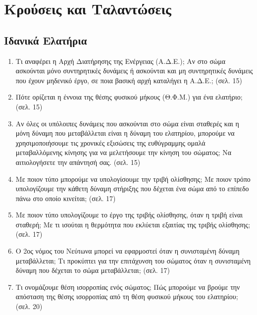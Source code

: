 \documentclass{article}
\begin{document}
\section[1]{Κρούσεις και Ταλαντώσεις}

\subsection{Ιδανικά Ελατήρια}

\begin{enumerate}

      \item
            Τι αναφέρει η Αρχή Διατήρησης της Ενέργειας (Α.Δ.Ε.); Αν στο σώμα ασκούνται μόνο συντηρητικές δυνάμεις ή ασκούνται και μη συντηρητικές δυνάμεις που έχουν μηδενικό έργο, σε ποια βασική αρχή καταλήγει η Α.Δ.Ε.; (σελ. 15)

      \item
            Πότε ορίζεται η έννοια της θέσης φυσικού μήκους (Θ.Φ.Μ.) για ένα ελατήριο; (σελ. 15)

      \item
            Αν όλες οι υπόλοιπες δυνάμεις που ασκούνται στο σώμα είναι σταθερές και η μόνη δύναμη που μεταβάλλεται είναι η δύναμη του ελατηρίου, μπορούμε να χρησιμοποιήσουμε τις χρονικές εξισώσεις της ευθύγραμμης ομαλά μεταβαλλόμενης κίνησης για να μελετήσουμε την κίνηση του σώματος; Να αιτιολογήσετε την απάντησή σας. (σελ. 15)

      \item
            Με ποιον τύπο μπορούμε να υπολογίσουμε την τριβή ολίσθησης; Με ποιον τρόπο υπολογίζουμε την κάθετη δύναμη στήριξης που δέχεται ένα σώμα από το επίπεδο πάνω στο οποίο κινείται; (σελ. 17)

      \item
            Με ποιον τύπο υπολογίζουμε το έργο της τριβής ολίσθησης, όταν η τριβή είναι σταθερή; Με τι ισούται η θερμότητα που εκλύεται εξαιτίας της τριβής ολίσθησης; (σελ. 17)

      \item
            Ο 2ος νόμος του Νεύτωνα μπορεί να εφαρμοστεί όταν η συνισταμένη δύναμη μεταβάλλεται; Τι προκύπτει για την επιτάχυνση του σώματος όταν η συνισταμένη δύναμη που δέχεται το σώμα μεταβάλλεται; (σελ. 17)

      \item
            Τι ονομάζουμε θέση ισορροπίας ενός σώματος; Πώς μπορούμε να βρούμε την απόσταση της θέσης ισορροπίας από τη θέση φυσικού μήκους του ελατηρίου; (σελ. 20)


\end{enumerate}
\end{document}
